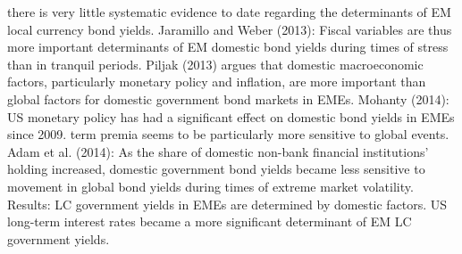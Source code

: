 there is very little systematic evidence to date regarding the determinants of EM local currency bond yields.
Jaramillo and Weber (2013): Fiscal variables are thus more important determinants of EM domestic bond yields during times of stress than in tranquil periods.
Piljak (2013) argues that domestic macroeconomic factors, particularly monetary policy and inflation, are more important than global factors for domestic government bond markets in EMEs.
Mohanty (2014): US monetary policy has had a significant effect on domestic bond yields in EMEs since 2009. term premia seems to be particularly more sensitive to global events.
Adam et al. (2014): As the share of domestic non-bank financial institutions' holding increased, domestic government bond yields became less sensitive to movement in global bond yields during times of extreme market volatility.
Results: 
LC government yields in EMEs are determined by domestic factors.
US long-term interest rates became a more significant determinant of EM LC government yields.


